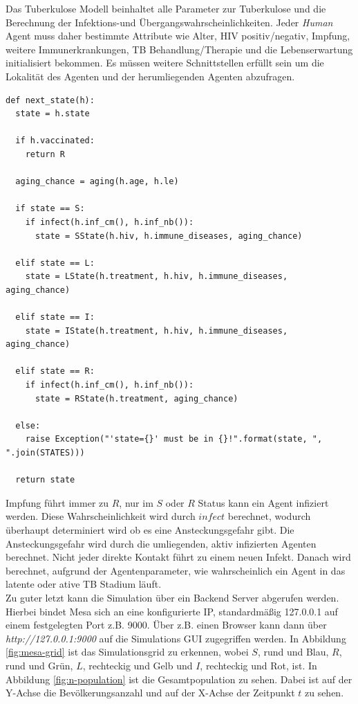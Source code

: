 \documentclass[paper=a4, fontsize=11pt, ngerman, abstract=on]{scrartcl}
\numberwithin{equation}{section} %
\numberwithin{figure}{section} %
\numberwithin{table}{section} %
\begin{document}
Das Tuberkulose Modell beinhaltet alle Parameter zur Tuberkulose und die Berechnung der Infektions-und Übergangswahrscheinlichkeiten. Jeder \textit{Human} Agent muss daher bestimmte Attribute wie Alter, HIV positiv/negativ, Impfung, weitere Immunerkrankungen, TB Behandlung/Therapie und die Lebenserwartung initialisiert bekommen. Es müssen weitere Schnittstellen erfüllt sein um die Lokalität des Agenten und der herumliegenden Agenten abzufragen.

\begin{lstlisting}[style=python]
def next_state(h):
  state = h.state

  if h.vaccinated:
    return R

  aging_chance = aging(h.age, h.le)

  if state == S:
    if infect(h.inf_cm(), h.inf_nb()):
      state = SState(h.hiv, h.immune_diseases, aging_chance)

  elif state == L:
    state = LState(h.treatment, h.hiv, h.immune_diseases, aging_chance)

  elif state == I:
    state = IState(h.treatment, h.hiv, h.immune_diseases, aging_chance)

  elif state == R:
    if infect(h.inf_cm(), h.inf_nb()):
      state = RState(h.treatment, aging_chance)

  else:
    raise Exception("'state={}' must be in {}!".format(state, ", ".join(STATES)))

  return state
\end{lstlisting}

Impfung führt immer zu $R$, nur im $S$ oder $R$ Status kann ein Agent infiziert werden. Diese Wahrscheinlichkeit wird durch $infect$ berechnet, wodurch überhaupt determiniert wird ob es eine Ansteckungsgefahr gibt. Die Ansteckungsgefahr wird durch die umliegenden, aktiv infizierten Agenten berechnet. Nicht jeder direkte Kontakt führt zu einem neuen Infekt. Danach wird berechnet, aufgrund der Agentenparameter, wie wahrscheinlich ein Agent in das latente oder ative TB Stadium läuft. \\

Zu guter letzt kann die Simulation über ein Backend Server abgerufen werden. Hierbei bindet Mesa sich an eine konfigurierte IP, standardmäßig 127.0.0.1 auf einem festgelegten Port z.B. 9000. Über z.B. einen Browser kann dann über \textit{http://127.0.0.1:9000} auf die Simulations GUI zugegriffen werden. In Abbildung \ref{fig:mesa-grid} ist das Simulationsgrid zu erkennen, wobei $S$, rund und Blau, $R$, rund und Grün, $L$, rechteckig und Gelb und $I$, rechteckig und Rot, ist. In Abbildung \ref{fig:n-population} ist die Gesamtpopulation zu sehen. Dabei ist auf der Y-Achse die Bevölkerungsanzahl und auf der X-Achse der Zeitpunkt $t$ zu sehen.
\end{document}
